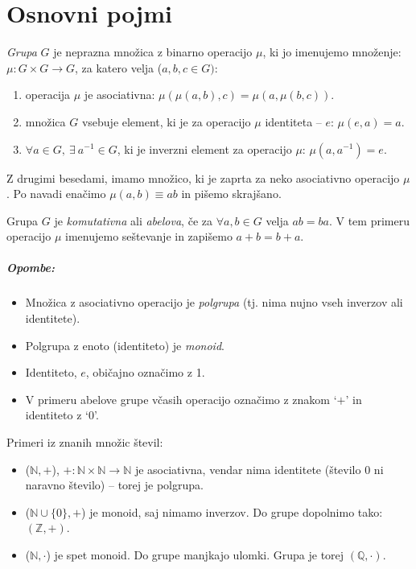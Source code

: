 \chapter{Osnovni pojmi}

\begin{defin}
	\emph{Grupa} $G$ je neprazna mno\v zica z binarno operacijo $\mu$, ki jo imenujemo
	mno\v zenje: $\mu: G\times G \to G$, za katero velja ($a, b, c \in G)$:
	\begin{enumerate}
		\item{operacija $\mu$ je asociativna: $\mu(\mu(a,b), c) = \mu(a, \mu(b, c))$.}
		\item{mno\v zica $G$ vsebuje element, ki je za operacijo $\mu$ identiteta -- $e$: $\mu (e, a) = a$.}
		\item{$\forall a \in G,\ \exists\ a^{-1} \in G$, ki je inverzni element za operacijo $\mu$: $\mu (a, a^{-1}) = e$.}
	\end{enumerate}
\end{defin}

\ni Z drugimi besedami, imamo mno\v zico, ki je zaprta za neko asociativno operacijo $\mu$. Po navadi ena\v cimo $\mu (a, b) \equiv ab$
in pi\v semo skraj\v sano.

\begin{defin}
	Grupa $G$ je \emph{komutativna} ali \emph{abelova}, \v ce za $\forall a,b \in G$ velja $ab = ba$. V tem primeru
	operacijo $\mu$ imenujemo se\v stevanje in zapi\v semo $a + b = b + a$.
\end{defin}

\paragraph{Opombe:}
\begin{itemize}
	\item{Mno\v zica z asociativno operacijo je \emph{polgrupa} (tj. nima nujno vseh inverzov ali identitete).}
	\item{Polgrupa z enoto (identiteto) je \emph{monoid}.}
	\item{Identiteto, $e$, obi\v cajno ozna\v cimo z 1.}
	\item{V primeru abelove grupe v\v casih operacijo ozna\v cimo z znakom `$+$' in identiteto z `$0$'.}
\end{itemize}

\ni Primeri iz znanih mno\v zic \v stevil:
\begin{itemize}
	\item{($\mathbb{N},+$), $+: \mathbb{N}\times\mathbb{N} \to \mathbb{N}$ je asociativna, vendar nima identitete
		(\v stevilo $0$ ni naravno \v stevilo) -- torej je polgrupa.}
	\item{($\mathbb{N}\cup\{0\}, +$) je monoid, saj nimamo inverzov. Do grupe dopolnimo tako: $(\mathbb{Z}, +)$.}
	\item{($\mathbb{N},\cdot$) je spet monoid. Do grupe manjkajo ulomki. Grupa je torej $(\mathbb{Q}, \cdot)$.}
\end{itemize}

